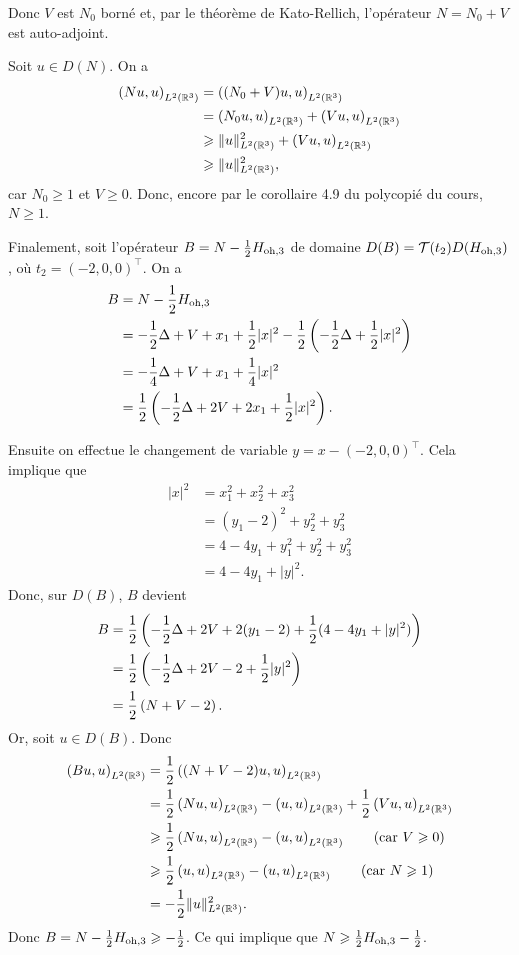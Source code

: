 Donc $V$ est $N_0$ borné et, par le théorème de Kato-Rellich,
l'opérateur $N = N_0 + V$ est auto-adjoint.

Soit $u \in D(N)$. On a
\begin{align}
    \left( Nu, u \right)_{L^2(\mathbb{R}^3)} &= \left( (N_0 + V)u, u \right)_{L^2(\mathbb{R}^3)} \\
    &= \left( N_0 u, u \right)_{L^2(\mathbb{R}^3)} + \left( Vu, u \right)_{L^2(\mathbb{R}^3)} \\
    & \geqslant \| u \|_{L^2(\mathbb{R}^3)}^2 + \left( Vu, u \right)_{L^2(\mathbb{R}^3)} \\
    & \geqslant \| u \|_{L^2(\mathbb{R}^3)}^2,
\end{align}
car $N_0 \geqslant 1$ et $V \geqslant 0$. Donc, encore par
le corollaire 4.9 du polycopié du cours, $N \geqslant 1$.

Finalement, soit l'opérateur
$B = N - \frac{1}{2} H_\text{oh,3}$ de domaine $D(B) = \mathcal{T}(t_2) D(H_\text{oh,3})$,
où $t_2 = (-2,0,0)^\intercal$. On a
\begin{align}
    B &= N - \frac{1}{2} H_\text{oh,3} \\
    &= -\frac{1}{2} \Delta + V + x_1 + \frac{1}{2} |x|^2 - \frac{1}{2} \left(-\frac{1}{2} \Delta + \frac{1}{2} |x|^2 \right) \\
    &= -\frac{1}{4} \Delta + V + x_1 + \frac{1}{4} |x|^2 \\
    &= \frac{1}{2} \left( -\frac{1}{2} \Delta + 2V + 2x_1 + \frac{1}{2} |x|^2 \right).
\end{align}

Ensuite on effectue le changement de variable $y = x - (-2,0,0)^\intercal$.
Cela implique que
\begin{align}
    |x|^2 &= x_1^2 + x_2^2 + x_3^2 \\
    &= (y_1 - 2)^2 + y_2^2 + y_3^2 \\
    &= 4 - 4y_1 + y_1^2 + y_2^2 + y_3^2 \\
    &= 4 - 4y_1 + |y|^2.
\end{align}
%
Donc, sur $D(B)$, $B$ devient
\begin{align}
    B &= \frac{1}{2} \left( -\frac{1}{2} \Delta + 2V + 2(y_1 - 2) + \frac{1}{2} (4 - 4y_1 + |y|^2) \right) \\
    &= \frac{1}{2} \left( -\frac{1}{2} \Delta + 2V - 2 + \frac{1}{2} |y|^2 \right) \\
    &= \frac{1}{2} \left( N + V - 2 \right).
\end{align}
%
Or, soit $u \in D(B)$. Donc
\begin{align}
    \left( Bu, u \right)_{L^2(\mathbb{R}^3)} &= \frac{1}{2} \left( (N + V - 2)u, u \right)_{L^2(\mathbb{R}^3)} \\
    &= \frac{1}{2} \left( Nu, u \right)_{L^2(\mathbb{R}^3)} - \left( u, u \right)_{L^2(\mathbb{R}^3)} + \frac{1}{2} \left( Vu, u \right)_{L^2(\mathbb{R}^3)} \\
    & \geqslant \frac{1}{2} \left( Nu, u \right)_{L^2(\mathbb{R}^3)} - \left( u, u \right)_{L^2(\mathbb{R}^3)}
    \qquad (\text{car } V \geqslant 0) \\
    & \geqslant \frac{1}{2} \left( u, u \right)_{L^2(\mathbb{R}^3)} - \left( u, u \right)_{L^2(\mathbb{R}^3)}
    \qquad (\text{car } N \geqslant 1) \\
    &= -\frac{1}{2} \| u \|_{L^2(\mathbb{R}^3)}^2.
\end{align}
%
Donc $B = N - \frac{1}{2} H_\text{oh,3} \geqslant -\frac{1}{2}$. Ce qui implique que
$N \geqslant \frac{1}{2} H_\text{oh,3} - \frac{1}{2}$.

